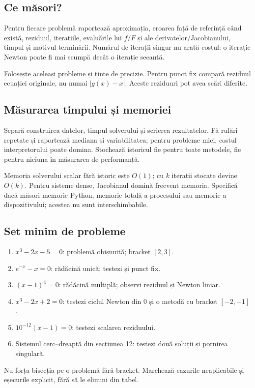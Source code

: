 \documentclass[11pt,a4paper]{article}
\begin{document}
\subsection{Ce măsori?}
Pentru fiecare problemă raportează aproximația, eroarea față de referință când există, reziduul, iterațiile, evaluările lui $f/F$ și ale derivatelor/Jacobianului, timpul și motivul terminării. Numărul de iterații singur nu arată costul: o iterație Newton poate fi mai scumpă decât o iterație secantă.

Folosește aceleași probleme și ținte de precizie. Pentru punct fix compară reziduul ecuației originale, nu numai $|g(x)-x|$. Aceste reziduuri pot avea scări diferite.

\subsection{Măsurarea timpului și memoriei}
Separă construirea datelor, timpul solverului și scrierea rezultatelor. Fă rulări repetate și raportează mediana și variabilitatea; pentru probleme mici, costul interpretorului poate domina. Stochează istoricul fie pentru toate metodele, fie pentru niciuna în măsurarea de performanță.

Memoria solverului scalar fără istoric este $O(1)$; cu $k$ iterații stocate devine $O(k)$. Pentru sisteme dense, Jacobianul domină frecvent memoria. Specifică dacă măsori memorie Python, memorie totală a procesului sau memorie a dispozitivului; acestea nu sunt interschimbabile.

\subsection{Set minim de probleme}
\begin{enumerate}
\item $x^3-2x-5=0$: problemă obișnuită; bracket $[2,3]$.
\item $e^{-x}-x=0$: rădăcină unică; testezi și punct fix.
\item $(x-1)^4=0$: rădăcină multiplă; observi reziduul și Newton liniar.
\item $x^3-2x+2=0$: testezi ciclul Newton din $0$ și o metodă cu bracket $[-2,-1]$.
\item $10^{-12}(x-1)=0$: testezi scalarea reziduului.
\item Sistemul cerc--dreaptă din secțiunea 12: testezi două soluții și pornirea singulară.
\end{enumerate}
Nu forța bisecția pe o problemă fără bracket. Marchează cazurile neaplicabile și eșecurile explicit, fără să le elimini din tabel.
\end{document}
